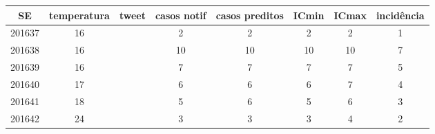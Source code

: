 \begin{tabular}{c|ccccccc}
  \hline
SE & temperatura & tweet & casos notif & casos preditos & ICmin & ICmax & incidência \\ 
  \hline
201637 & 16 &  & 2 & 2 & 2 & 2 & 1 \\ 
  201638 & 16 &  & 10 & 10 & 10 & 10 & 7 \\ 
  201639 & 16 &  & 7 & 7 & 7 & 7 & 5 \\ 
  201640 & 17 &  & 6 & 6 & 6 & 7 & 4 \\ 
  201641 & 18 &  & 5 & 6 & 5 & 6 & 3 \\ 
  201642 & 24 &  & 3 & 3 & 3 & 4 & 2 \\ 
   \hline
\end{tabular}
